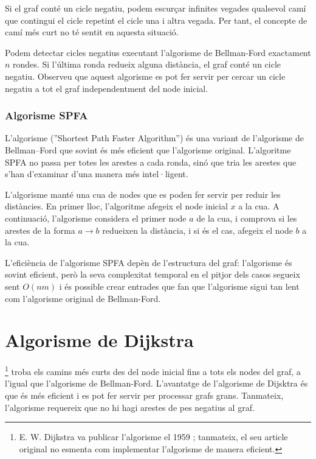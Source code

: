 Si el graf conté un cicle negatiu, podem escurçar infinites vegades
qualsevol camí que contingui el cicle repetint el cicle una i altra
vegada. Per tant, el concepte de camí més curt no té sentit en aquesta
situació.

Podem detectar cicles negatius executant l'algorisme de Bellman-Ford
exactament $n$ rondes. Si l'última ronda redueix alguna distància, el
graf conté un cicle negatiu. Observeu que aquest algorisme es pot fer
servir per cercar un cicle negatiu a tot el graf independentment del
node inicial.

\subsubsection{Algorisme SPFA}


L'algorisme  (''Shortest Path Faster Algorithm'')
\cite{fan94} és una variant de l'algorisme de Bellman–Ford que sovint
és més eficient que l'algorisme original. L'algoritme SPFA no passa
per totes les arestes a cada ronda, sinó que tria les arestes que
s'han d'examinar d'una manera més intel·ligent.

L'algorisme manté una cua de nodes que es poden fer servir per reduir
les distàncies. En primer lloc, l'algoritme afegeix el node inicial
$x$ a la cua. A continuació, l'algorisme considera el primer node $a$
de la cua, i comprova si les arestes de la forma $a \rightarrow b$
redueixen la distància, i si és el cas, afegeix el node $b$ a la cua.

L'eficiència de l'algorisme SPFA depèn de l'estructura del graf:
l'algorisme és sovint eficient, però la seva complexitat temporal en
el pitjor dels casos segueix sent $O(nm)$ i és possible crear entrades
que fan que l'algorisme sigui tan lent com l'algorisme original de
Bellman-Ford.

\section{Algorisme de Dijkstra}


\footnote{E. W. Dijkstra va publicar
l'algorisme el 1959 \cite{dij59}; tanmateix, el seu article original
no esmenta com implementar l'algorisme de manera eficient.} troba els
camins més curts des del node inicial fins a tots els nodes del graf,
a l'igual que l'algorisme de Bellman-Ford. L'avantatge de l'algorisme de
Dijsktra és que és més eficient i es pot fer servir per processar grafs
grans. Tanmateix, l'algorisme requereix que no hi hagi arestes de pes
negatius al graf.

